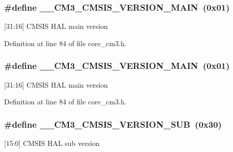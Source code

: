 \subsubsection[{\texorpdfstring{\+\_\+\+\_\+\+C\+M3\+\_\+\+C\+M\+S\+I\+S\+\_\+\+V\+E\+R\+S\+I\+O\+N\+\_\+\+M\+A\+IN}{__CM3_CMSIS_VERSION_MAIN}}]{\setlength{\rightskip}{0pt plus 5cm}\#define \+\_\+\+\_\+\+C\+M3\+\_\+\+C\+M\+S\+I\+S\+\_\+\+V\+E\+R\+S\+I\+O\+N\+\_\+\+M\+A\+IN~(0x01)}\hypertarget{group___c_m_s_i_s___c_m3__core__definitions_gac1c1120e9fe082fac8225c60143ac79a}{}\label{group___c_m_s_i_s___c_m3__core__definitions_gac1c1120e9fe082fac8225c60143ac79a}
\mbox{[}31\+:16\mbox{]} C\+M\+S\+IS H\+AL main version 

Definition at line 84 of file core\+\_\+cm3.\+h.

\subsubsection[{\texorpdfstring{\+\_\+\+\_\+\+C\+M3\+\_\+\+C\+M\+S\+I\+S\+\_\+\+V\+E\+R\+S\+I\+O\+N\+\_\+\+M\+A\+IN}{__CM3_CMSIS_VERSION_MAIN}}]{\setlength{\rightskip}{0pt plus 5cm}\#define \+\_\+\+\_\+\+C\+M3\+\_\+\+C\+M\+S\+I\+S\+\_\+\+V\+E\+R\+S\+I\+O\+N\+\_\+\+M\+A\+IN~(0x01)}\hypertarget{group___c_m_s_i_s___c_m3__core__definitions_gac1c1120e9fe082fac8225c60143ac79a}{}\label{group___c_m_s_i_s___c_m3__core__definitions_gac1c1120e9fe082fac8225c60143ac79a}
\mbox{[}31\+:16\mbox{]} C\+M\+S\+IS H\+AL main version 

Definition at line 84 of file core\+\_\+cm3.\+h.

\subsubsection[{\texorpdfstring{\+\_\+\+\_\+\+C\+M3\+\_\+\+C\+M\+S\+I\+S\+\_\+\+V\+E\+R\+S\+I\+O\+N\+\_\+\+S\+UB}{__CM3_CMSIS_VERSION_SUB}}]{\setlength{\rightskip}{0pt plus 5cm}\#define \+\_\+\+\_\+\+C\+M3\+\_\+\+C\+M\+S\+I\+S\+\_\+\+V\+E\+R\+S\+I\+O\+N\+\_\+\+S\+UB~(0x30)}\hypertarget{group___c_m_s_i_s___c_m3__core__definitions_ga9ff7a998d4b8b3c87bfaca6e78607950}{}\label{group___c_m_s_i_s___c_m3__core__definitions_ga9ff7a998d4b8b3c87bfaca6e78607950}
\mbox{[}15\+:0\mbox{]} C\+M\+S\+IS H\+AL sub version 

